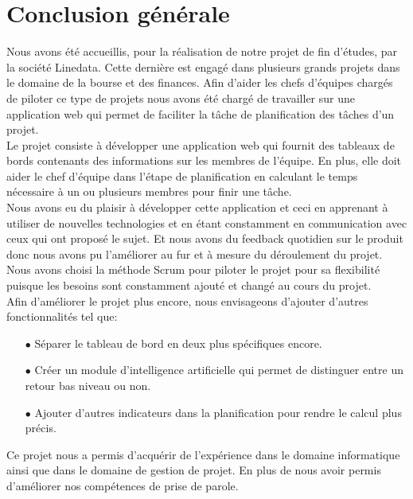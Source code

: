 \chapter*{Conclusion générale}
Nous avons été accueillis, pour la réalisation de notre projet de fin d'études, par la société Linedata. Cette dernière est engagé dans plusieurs grands projets dans le domaine de la bourse et des finances. Afin d'aider les chefs d'équipes chargés de piloter ce type de projets nous avons été chargé de travailler sur une application web qui permet de faciliter la tâche de planification des tâches d'un projet.\\

Le projet consiste à développer une application web qui fournit des tableaux de bords contenants des informations sur les membres de l'équipe. En plus, elle doit aider le chef d'équipe dans l'étape de planification en calculant le temps nécessaire à un ou plusieurs membres pour finir une tâche.\\

Nous avons eu du plaisir à développer cette application et ceci en apprenant à utiliser de nouvelles technologies et en étant constamment en communication avec ceux qui ont proposé le sujet. Et nous avons du feedback quotidien sur le produit donc nous avons pu l'améliorer au fur et à mesure du déroulement du projet.\\

Nous avons choisi la méthode Scrum pour piloter le projet pour sa flexibilité puisque les besoins sont constamment ajouté et changé au cours du projet.\\

Afin d'améliorer le projet plus encore, nous envisageons d'ajouter d'autres fonctionnalités tel que:
\begin{itemize}
    \item[$\bullet$] Séparer le tableau de bord en deux plus spécifiques encore.
    \item[$\bullet$] Créer un module d'intelligence artificielle qui permet de distinguer entre un retour bas niveau ou non.
    \item[$\bullet$] Ajouter d'autres indicateurs dans la planification pour rendre le calcul plus précis.\\
\end{itemize}

Ce projet nous a permis d'acquérir de l'expérience dans le domaine informatique ainsi que dans le domaine de gestion de projet. En plus de nous avoir permis d'améliorer nos compétences de prise de parole.